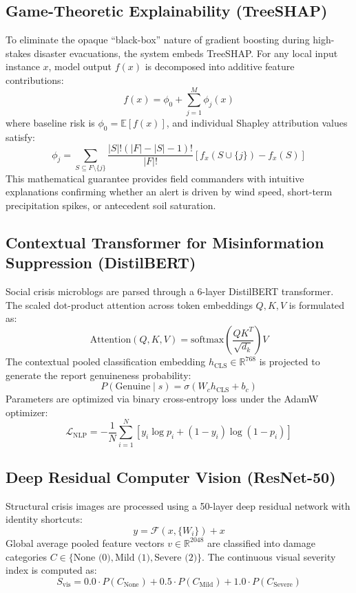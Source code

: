 \documentclass{article}
\begin{document}
\subsection{Game-Theoretic Explainability (TreeSHAP)}
To eliminate the opaque ``black-box'' nature of gradient boosting during high-stakes disaster evacuations, the system embeds TreeSHAP. For any local input instance $x$, model output $f(x)$ is decomposed into additive feature contributions:
\begin{equation}
f(x) = \phi_0 + \sum_{j=1}^M \phi_j(x)
\end{equation}
where baseline risk is $\phi_0 = \mathbb{E}[f(x)]$, and individual Shapley attribution values satisfy:
\begin{equation}
\phi_j = \sum_{S \subseteq F \setminus \{j\}} \frac{|S|!(|F| - |S| - 1)!}{|F|!} \left[ f_x(S \cup \{j\}) - f_x(S) \right]
\end{equation}
This mathematical guarantee provides field commanders with intuitive explanations confirming whether an alert is driven by wind speed, short-term precipitation spikes, or antecedent soil saturation.

\subsection{Contextual Transformer for Misinformation Suppression (DistilBERT)}
Social crisis microblogs are parsed through a 6-layer DistilBERT transformer. The scaled dot-product attention across token embeddings $Q, K, V$ is formulated as:
\begin{equation}
\text{Attention}(Q, K, V) = \text{softmax}\left( \frac{QK^T}{\sqrt{d_k}} \right) V
\end{equation}
The contextual pooled classification embedding $h_{\text{CLS}} \in \mathbb{R}^{768}$ is projected to generate the report genuineness probability:
\begin{equation}
P(\text{Genuine} \mid s) = \sigma(W_c h_{\text{CLS}} + b_c)
\end{equation}
Parameters are optimized via binary cross-entropy loss under the AdamW optimizer:
\begin{equation}
\mathcal{L}_{\text{NLP}} = -\frac{1}{N}\sum_{i=1}^N \left[ y_i \log p_i + (1 - y_i) \log(1 - p_i) \right]
\end{equation}

\subsection{Deep Residual Computer Vision (ResNet-50)}
Structural crisis images are processed using a 50-layer deep residual network with identity shortcuts:
\begin{equation}
y = \mathcal{F}(x, \{W_i\}) + x
\end{equation}
Global average pooled feature vectors $v \in \mathbb{R}^{2048}$ are classified into damage categories $C \in \{\text{None (0)}, \text{Mild (1)}, \text{Severe (2)}\}$. The continuous visual severity index is computed as:
\begin{equation}
S_{\text{vis}} = 0.0 \cdot P(C_{\text{None}}) + 0.5 \cdot P(C_{\text{Mild}}) + 1.0 \cdot P(C_{\text{Severe}})
\end{equation}
\end{document}
